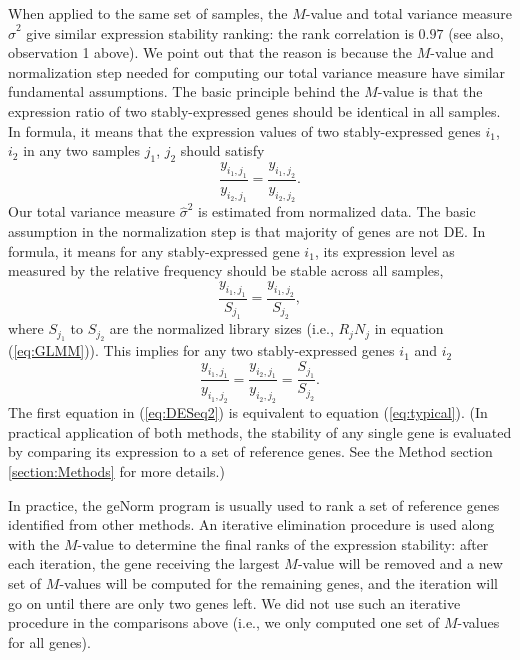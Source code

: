 \documentclass[letterpaper,12pt]{article}
\begin{document}
When applied to the same set of samples, the $M$-value and total variance
measure $\hat\sigma^2$ give similar expression stability ranking: the rank
correlation is $0.97$ (see also, observation 1 above).
We point out that the reason is because the $M$-value and normalization step
needed for computing our total variance measure have similar fundamental
assumptions. 
The basic principle
behind the $M$-value is that the expression ratio of two stably-expressed
genes should be identical in all samples. In formula, it means that the
expression values of two stably-expressed genes $i_1$, $i_2$ in any two samples $j_1$, $j_2$
should satisfy
\begin{equation}\label{eq:typical}
   \dfrac{y_{i_1, j_1}}{y_{i_2, j_1}} = \dfrac{y_{i_1, j_2}}{y_{i_2, j_2}}.
\end{equation} 
Our total variance measure $\hat\sigma^2$ is estimated from normalized data.
The basic assumption in the normalization step is that majority of genes are
not DE. In formula, it means for any stably-expressed gene $i_1$, its expression
level as measured by the relative frequency should be stable across all
samples,
\begin{equation}\label{eq:DESeq} 
    \frac{y_{i_1, j_1}}{S_{j_1}}= \dfrac{y_{i_1, j_2}}{S_{j_2}},
\end{equation}
where $S_{j_1}$ to $S_{j_2}$ are the normalized library sizes (i.e., $R_j N_j$ in equation (\ref{eq:GLMM})).
This implies for any two stably-expressed genes $i_1$ and $i_2$
\begin{equation}\label{eq:DESeq2} 
    \frac{y_{i_1, j_1}}{y_{i_1, j_2}} = \frac{y_{i_2, j_1}}{y_{i_2, j_2}} =
    \frac{S_{j_1}}{S_{j_2}}.
\end{equation}
The first equation in (\ref{eq:DESeq2}) is equivalent to equation
(\ref{eq:typical}). (In practical application of both methods, the stability
of any single gene is evaluated by comparing its expression to a set of
reference genes. See the Method section \ref{section:Methods} for more details.)

In practice, the geNorm program \citep{vandesompele2002accurate} is usually
used to rank a set of reference genes identified from other methods.  An
iterative elimination procedure is used along with the $M$-value to determine
the final ranks of the expression stability:  after each iteration, the gene
receiving the largest $M$-value will be removed and a new set of $M$-values
will be computed for the remaining genes, and the iteration will go on until
there are only two genes left.  We did not use such an iterative procedure in
the comparisons above (i.e., we only computed one set of $M$-values for all
genes). 
\end{document}
